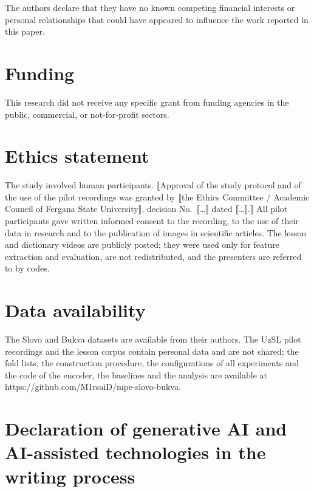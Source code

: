The authors declare that they have no known competing financial interests or personal relationships that could have appeared to influence the work reported in this paper.

\hypertarget{funding}{%
\section{Funding}\label{funding}}

This research did not receive any specific grant from funding agencies in the public, commercial, or not-for-profit sectors.

\hypertarget{ethics-statement}{%
\section{Ethics statement}\label{ethics-statement}}

The study involved human participants. ⟦Approval of the study protocol and of the use of the pilot recordings was granted by ⟦the Ethics Committee / Academic Council of Fergana State University⟧, decision No.~⟦\ldots⟧ dated ⟦\ldots⟧.⟧ All pilot participants gave written informed consent to the recording, to the use of their data in research and to the publication of images in scientific articles. The lesson and dictionary videos are publicly posted; they were used only for feature extraction and evaluation, are not redistributed, and the presenters are referred to by codes.

\hypertarget{data-availability}{%
\section{Data availability}\label{data-availability}}

The Slovo and Bukva datasets are available from their authors. The UzSL pilot recordings and the lesson corpus contain personal data and are not shared; the fold lists, the construction procedure, the configurations of all experiments and the code of the encoder, the baselines and the analysis are available at https://github.com/M1rsaiD/mpe-slovo-bukva.

\hypertarget{declaration-of-generative-ai-and-ai-assisted-technologies-in-the-writing-process}{%
\section{Declaration of generative AI and AI-assisted technologies in the writing process}\label{declaration-of-generative-ai-and-ai-assisted-technologies-in-the-writing-process}}

